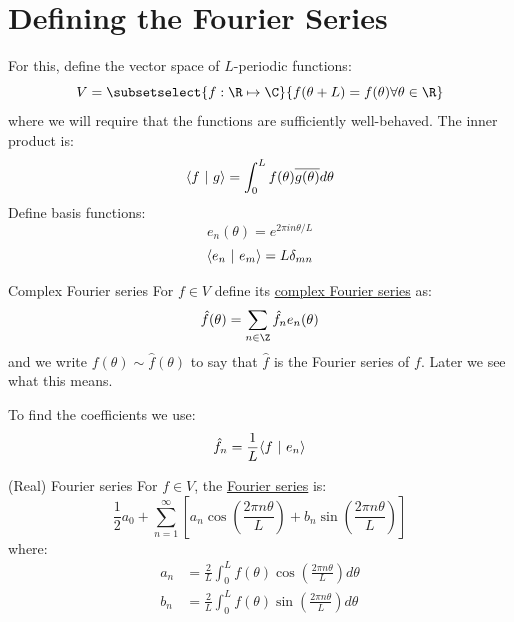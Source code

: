 \documentclass[../Main.tex]{subfiles}
\begin{document}
\section{Defining the Fourier Series}
For this, define the vector space of $L$-periodic functions:
\begin{equation*}
    V = \subsetselect{f : \R \mapsto \C}{f(\theta + L) = f(\theta) \forall \theta \in \R}
\end{equation*}
where we will require that the functions are sufficiently well-behaved. The inner product is:
\begin{equation*}
    \langle f~\vert~g\rangle = \int_{0}^{L} f(\theta)\overline{g(\theta)} d\theta
\end{equation*}
Define basis functions:
\begin{equation*}
    e_n(\theta) = e^{2\pi i n \theta / L}
\end{equation*}
\begin{equation*}
    \langle e_n~\vert~e_m\rangle = L\delta_{mn}
\end{equation*}
\begin{definition}{Complex Fourier series}
    For $f \in V$ define its \underline{complex Fourier series} as:
    \begin{equation*}
        \hat{f}(\theta) = \sum_{n \in \Z} \hat{f}_n e_n(\theta)
    \end{equation*}
    and we write $f(\theta) \sim \hat{f}(\theta)$ to say that $\hat{f}$ is the Fourier series of $f$. Later we see what this means.
\end{definition}
To find the coefficients we use:
\begin{equation*}
    \hat{f}_n = \frac1L \langle f~\vert~e_n\rangle
\end{equation*}
\begin{definition}{(Real) Fourier series}
    For $f \in V$, the \underline{Fourier series} is:
    \begin{equation*}
        \frac12 a_0 + \sum_{n=1}^{\infty} \left[a_n \cos\left(\frac{2\pi n \theta}{L}\right) + b_n \sin\left(\frac{2\pi n \theta}{L}\right)\right]
    \end{equation*}
    where:
    \begin{align*}
        a_n &= \frac2L \int_{0}^{L} f(\theta)\cos\left(\frac{2\pi n \theta}{L}\right) d\theta \\
        b_n &= \frac2L \int_{0}^{L} f(\theta)\sin\left(\frac{2\pi n \theta}{L}\right) d\theta \\
    \end{align*}
\end{definition}
\end{document}
